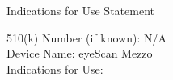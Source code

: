 \newpage
{}

\begin{center}
  \huge{Indications for Use Statement}\\[.5in]
\end{center}


\onehalfspacing

510(k) Number (if known): N/A \\
Device Name: eyeScan Mezzo \\
Indications for Use: 

